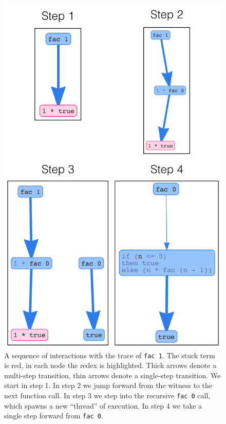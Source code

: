 \begin{figure}[t]
\centering
\includegraphics[width=0.8\linewidth]{fac-steps.png}
\caption{A sequence of interactions with the trace of
  \texttt{fac 1}. The stuck term is red, in each node the redex is
  highlighted. Thick arrows denote a multi-step transition, thin arrows
  denote a single-step transition. We start in step 1. In step 2 we jump
  forward from the witness to the next function call. In step 3 we step
  into the recursive \texttt{fac 0} call, which spawns a new ``thread''
  of execution. In step 4 we take a single step forward from
  \texttt{fac 0}.} %
\label{fig:nanomaly-factorial}
\end{figure}

%
%
%
